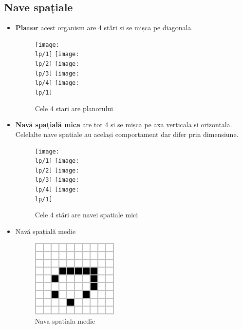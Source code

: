 \documentclass[11pt ,A4]{article}
\begin{document}
            \subsection{Nave spațiale}
                \begin{itemize}

                    \item \textbf{Planor} acest organism are 4 stări si se mișca pe diagonala.
                        \begin{figure}[H]
                            \newcommand\lp{organisme/nave/planor}
                            \centering
                            \texttt{[image: \\lp/1]}
                            \texttt{[image: \\lp/2]}
                            \texttt{[image: \\lp/3]}
                            \texttt{[image: \\lp/4]}
                            \texttt{[image: \\lp/1]}
                            \caption{Cele 4 stari are planorului}
                        \end{figure}

                    \item \textbf{Navă spațială mica} are tot 4 si se mișca pe axa verticala si orizontala.
                          Celelalte nave spatiale au același comportament dar difer prin dimensiune.
                        \begin{figure}[H]
                            \newcommand\lp{organisme/nave/navaMica}
                            \centering
                            \texttt{[image: \\lp/1]}
                            \texttt{[image: \\lp/2]}
                            \texttt{[image: \\lp/3]}
                            \texttt{[image: \\lp/4]}
                            \texttt{[image: \\lp/1]}
                            \caption{Cele 4 stări are navei spatiale mici}
                        \end{figure}

                    \item Navă spațială medie
                        \begin{figure}[H]
                            \centering
                            \includegraphics[scale=0.7]{organisme/nave/navaMedie}
                            \caption{Nava spatiala medie}
                        \end{figure}


\end{itemize}
\end{document}
